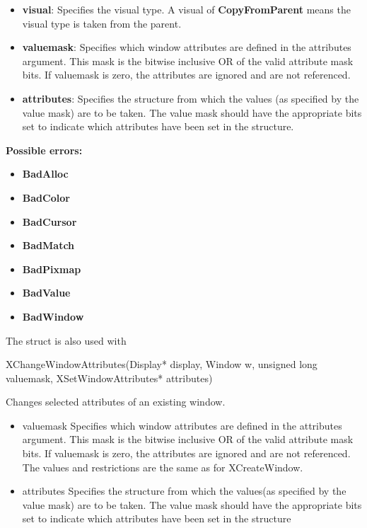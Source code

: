 \documentclass{report}
\begin{document}
\begin{itemize}
\begin{itemize}
                \item \textbf{visual}: Specifies the visual type. A visual of \textbf{CopyFromParent} means the visual type is taken from the parent.
                \item \textbf{valuemask}: Specifies which window attributes are defined in the attributes argument. This mask is the bitwise inclusive OR of the valid attribute mask bits. If valuemask is zero, the attributes are ignored and are not referenced.
                \item \textbf{attributes}: Specifies the structure from which the values (as specified by the value mask) are to be taken. The value mask should have the appropriate bits set to indicate which attributes have been set in the structure.
            \end{itemize}
            \textbf{Possible errors:}
            \begin{itemize}
                \item \textbf{BadAlloc}
                \item \textbf{BadColor}
                \item \textbf{BadCursor}
                \item \textbf{BadMatch}
                \item \textbf{BadPixmap}
                \item \textbf{BadValue}
                \item \textbf{BadWindow}
            \end{itemize}
            The struct is also used with
            \bigbreak \noindent 
            \begin{cppcode}
                XChangeWindowAttributes(Display* display, Window w, unsigned long valuemask, XSetWindowAttributes* attributes)
            \end{cppcode}
            \bigbreak \noindent
            Changes selected attributes of an existing window.
            \begin{itemize}
                \item valuemask Specifies which window attributes are defined in the attributes argument. This mask is the bitwise inclusive OR of the valid attribute mask bits. If valuemask is zero, the attributes are ignored and are not referenced. The values and restrictions are the same as for XCreateWindow.
                \item attributes Specifies the structure from which the values(as specified by the value mask) are to be taken. The value mask should have the appropriate bits set to indicate which attributes have been set in the structure

\end{itemize}
\end{itemize}
\end{document}
